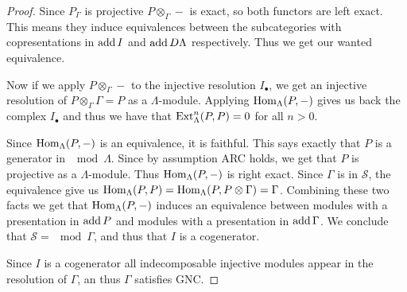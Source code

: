 \begin{theorem}
\begin{proof}
		Since $P_\Gamma$ is projective $P\otimes_\Gamma -$ is exact, so both functors are left exact. This means they induce equivalences between the subcategories with copresentations in $\operatorname{add} I$ and $\operatorname{add} D\Lambda$ respectively. Thus we get our wanted equivalence.
		
		Now if we apply $P\otimes_\Gamma -$ to the injective resolution $I_\bullet$, we get an injective resolution of $P\otimes_\Gamma\Gamma = P$ as a $\Lambda$-module. Applying $\operatorname{Hom}_\Lambda(P, -)$ gives us back the complex $I_\bullet$ and thus we have that $\operatorname{Ext}_\Lambda^n(P, P)=0$ for all $n>0$. 
		
		Since $\operatorname{Hom}_\Lambda(P, -)$ is an equivalence, it is faithful. This says exactly that $P$ is a generator in $\mod\Lambda$. Since by assumption ARC holds, we get that $P$ is projective as a $\Lambda$-module. Thus $\operatorname{Hom}_\Lambda(P, -)$ is right exact. Since $\Gamma$ is in $\mathcal S$, the equivalence give us $\operatorname{Hom}_\Lambda(P, P) = \operatorname{Hom}_\Lambda(P, P\otimes \Gamma) = \Gamma$. Combining these two facts we get that $\operatorname{Hom}_\Lambda(P,-)$ induces an equivalence between modules with a presentation in $\operatorname{add} P$ and modules with a presentation in $\operatorname{add} \Gamma$. We conclude that $\mathcal S = \mod\Gamma$, and thus that $I$ is a cogenerator.
		
		Since $I$ is a cogenerator all indecomposable injective modules appear in the resolution of $\Gamma$, an thus $\Gamma$ satisfies GNC.
	\end{proof}
\end{theorem}
%
%		
